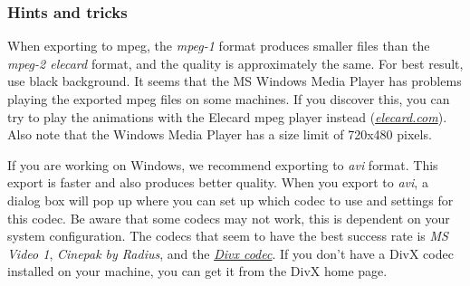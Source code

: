 \subsubsection{Hints and tricks}

When exporting to mpeg, the {\sl mpeg-1} format produces smaller files than the
{\sl mpeg-2 elecard} format, and the quality is approximately the same.
For best result, use black background.
It seems that the MS Windows Media Player has problems playing the exported
mpeg files on some machines. If you discover this, you can try to play the
animations with the Elecard mpeg player instead
(\href{https://www.elecard.com/}{\sl elecard.com}).
Also note that the Windows Media Player has a size limit of 720x480 pixels.

If you are working on Windows, we recommend exporting to {\sl avi} format.
This export is faster and also produces better quality. When you
export to {\sl avi}, a dialog box will pop up where you can set up
which codec to use and settings for this codec. Be aware that some
codecs may not work, this is dependent on your system configuration.
The codecs that seem to have the best success rate is {\sl MS Video 1},
{\sl Cinepak by Radius}, and the \href{https://www.divx.com/}{\sl Divx codec}.
If you don't have a DivX codec installed on your machine,
you can get it from the DivX home page.

